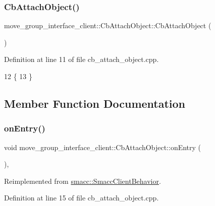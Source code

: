 \subsubsection{\texorpdfstring{Cb\+Attach\+Object()}{CbAttachObject()}\hspace{0.1cm}{\footnotesize\ttfamily [2/2]}}
{\footnotesize\ttfamily move\+\_\+group\+\_\+interface\+\_\+client\+::\+Cb\+Attach\+Object\+::\+Cb\+Attach\+Object (\begin{DoxyParamCaption}{ }\end{DoxyParamCaption})}



Definition at line 11 of file cb\+\_\+attach\+\_\+object.\+cpp.


\begin{DoxyCode}
12     \{
13     \}
\end{DoxyCode}


\subsection{Member Function Documentation}
\mbox{\label{classmove__group__interface__client_1_1CbAttachObject_a85ddd1ee5d0057fe489de10007982f22}} 
\subsubsection{\texorpdfstring{on\+Entry()}{onEntry()}}
{\footnotesize\ttfamily void move\+\_\+group\+\_\+interface\+\_\+client\+::\+Cb\+Attach\+Object\+::on\+Entry (\begin{DoxyParamCaption}{ }\end{DoxyParamCaption})\hspace{0.3cm}{\ttfamily [override]}, {\ttfamily [virtual]}}



Reimplemented from \hyperlink{classsmacc_1_1SmaccClientBehavior_a7962382f93987c720ad432fef55b123f}{smacc\+::\+Smacc\+Client\+Behavior}.



Definition at line 15 of file cb\+\_\+attach\+\_\+object.\+cpp.



